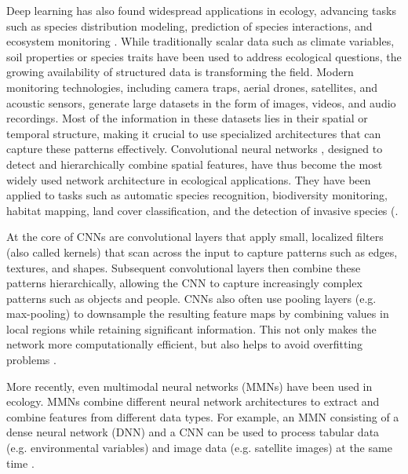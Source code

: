 \documentclass[12pt,twoside]{scrreport}
\begin{document}
Deep learning has also found widespread applications in ecology, advancing tasks such as species distribution modeling, prediction of species interactions, and ecosystem monitoring \citep{chenEndEndLearningDeep2018, wilkinsonComparisonJointSpecies2019, pichlerMachineLearningAlgorithms2020, pichlerMachineLearningDeep2023, borowiecDeepLearningTool2022, tuiaPerspectivesMachineLearning2022, christinApplicationsDeepLearning2019}. While traditionally scalar data such as climate variables, soil properties or species traits have been used to address ecological questions, the growing availability of structured data is transforming the field. Modern monitoring technologies, including camera traps, aerial drones, satellites, and acoustic sensors, generate large datasets in the form of images, videos, and audio recordings. Most of the information in these datasets lies in their spatial or temporal structure, making it crucial to use specialized architectures that can capture these patterns effectively. Convolutional neural networks \citep[CNNs,]{lecunBackpropagationAppliedHandwritten1989a}, designed to detect and hierarchically combine spatial features, have thus become the most widely used network architecture in ecological applications. They have been applied to tasks such as automatic species recognition, biodiversity monitoring, habitat mapping, land cover classification, and the detection of invasive species (\citep{gomezvillaAutomaticWildAnimal2017, norouzzadehAutomaticallyIdentifyingCounting2018, tabakMachineLearningClassify2019, salamonFusingShallowDeep2017, liDeepLearningRemote2018, kattenbornConvolutionalNeuralNetworks2019, qianUAVDeepConvolutional2020}.

At the core of CNNs are convolutional layers that apply small, localized filters (also called kernels) that scan across the input to capture patterns such as edges, textures, and shapes. Subsequent convolutional layers then combine these patterns hierarchically, allowing the CNN to capture increasingly complex patterns such as objects and people. CNNs also often use pooling layers (e.g. max-pooling) to downsample the resulting feature maps by combining values in local regions while retaining significant information. This not only makes the network more computationally efficient, but also helps to avoid overfitting problems \citep{liSurveyConvolutionalNeural2022}.

More recently, even multimodal neural networks (MMNs) have been used in ecology. MMNs combine different neural network architectures to extract and combine features from different data types. For example, an MMN consisting of a dense neural network (DNN) and a CNN can be used to process tabular data (e.g. environmental variables) and image data (e.g. satellite images) at the same time \citep{zhangNovelMultimodalSpecies2022, hu2024introduction}.
\end{document}
